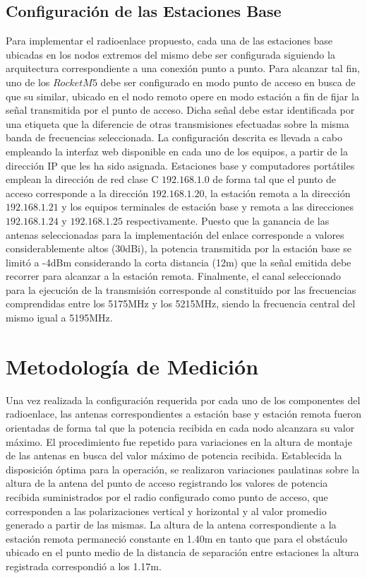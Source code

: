 \documentclass[conference]{IEEEtran}
\begin{document}
\subsection{Configuración de las Estaciones Base}
Para implementar el radioenlace propuesto, cada una de las estaciones base ubicadas en los nodos extremos del 
mismo debe ser configurada siguiendo la arquitectura correspondiente a una conexión punto a punto. Para alcanzar 
tal fin, uno de los $RocketM5$ debe ser configurado en modo punto de acceso en busca de que su similar, ubicado en el
nodo remoto opere en modo estación a fin de fijar la señal transmitida por el punto de acceso. Dicha señal debe estar
identificada por una etiqueta que la diferencie de otras transmisiones efectuadas sobre la misma banda de frecuencias 
seleccionada. La configuración descrita es llevada a cabo empleando la interfaz web disponible en cada uno de los equipos,
a partir de la dirección IP que les ha sido asignada. Estaciones base y computadores portátiles emplean la dirección de red 
clase C $\textit{192.168.1.0}$ de forma tal que el punto de acceso corresponde a la dirección $\textit{192.168.1.20}$, la estación remota a
la dirección $\textit{192.168.1.21}$ y los equipos terminales de estación base y remota a las direcciones $\textit{192.168.1.24}$ y $\textit{192.168.1.25}$
respectivamente. Puesto que la ganancia de las antenas seleccionadas para la implementación del enlace corresponde a valores
considerablemente altos (30dBi), la potencia transmitida por la estación base se limitó a -4dBm considerando la corta 
distancia (12m) que la señal emitida debe recorrer para alcanzar a la estación remota. Finalmente, el canal seleccionado 
para la ejecución de la transmisión corresponde al constituido por las frecuencias comprendidas entre los 5175MHz y los 5215MHz, 
siendo la frecuencia central del mismo igual a 5195MHz.
\section{Metodología de Medición}
Una vez realizada la configuración requerida por cada uno de los componentes del radioenlace, las antenas correspondientes a 
estación base y estación remota fueron orientadas de forma tal que la potencia recibida en cada nodo alcanzara su valor máximo. El 
procedimiento fue repetido para variaciones en la altura de montaje de las antenas en busca del valor máximo de potencia recibida. 
Establecida la disposición óptima para la operación, se realizaron variaciones paulatinas sobre la altura de la antena del punto de acceso
registrando los valores de potencia recibida suministrados por el radio configurado como punto de acceso, que corresponden a las polarizaciones vertical y horizontal 
y al valor promedio generado a partir de las mismas. La altura de la antena correspondiente a la estación remota permaneció constante en 1.40m en tanto
que para el obstáculo ubicado en el punto medio de la distancia de separación entre estaciones la altura registrada correspondió a los 1.17m.
\end{document}
